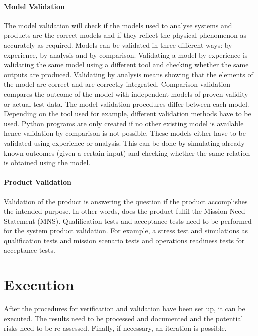 \paragraph{Model Validation}
The model validation will check if the models used to analyse systems and products are the correct models and if they reflect the physical phenomenon as accurately as required. Models can be validated in three different ways: by experience, by analysis and by comparison. Validating a model by experience is validating the same model using a different tool and checking whether the same outputs are produced. Validating by analysis means showing that the elements of the model are correct and are correctly integrated. Comparison validation compares the outcome of the model with independent models of proven validity or actual test data. The model validation procedures differ between each model. Depending on the tool used for example, different validation methods have to be used. Python programs are only created if no other existing model is available hence validation by comparison is not possible. These models either have to be validated using experience or analysis. This can be done by simulating already known outcomes (given a certain input) and checking whether the same relation is obtained using the model. 


\paragraph{Product Validation}
Validation of the product is answering the question if the product accomplishes the intended purpose. In other words, does the product fulfil the Mission Need Statement (MNS). Qualification tests and acceptance tests need to be performed for the system product validation. For example, a stress test and simulations as qualification tests and mission scenario tests and operations readiness tests for acceptance tests.

\section{Execution}
After the procedures for verification and validation have been set up, it can be executed. The results need to be processed and documented and the potential risks need to be re-assessed. Finally, if necessary, an iteration is possible.


